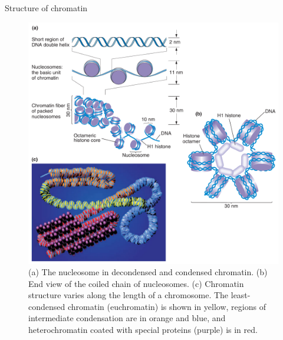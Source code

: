 \documentclass[11pt,ignorenonframetext,aspectratio=169]{beamer}
\begin{document}
\begin{frame}{Structure of chromatin}
\protect\hypertarget{structure-of-chromatin}{}
\begin{figure}

{\centering \includegraphics[width=0.45\linewidth]{../images/structure_of_chromatin} 

}

\caption{(a) The nucleosome in decondensed and condensed chromatin. (b) End view of the coiled chain of nucleosomes. (c) Chromatin structure varies along the length of a chromosome. The least-condensed chromatin (euchromatin) is shown in yellow, regions of intermediate condensation are in orange and blue, and heterochromatin coated with special proteins (purple) is in red.}\label{fig:structure-of-chromatin}
\end{figure}
\end{frame}
\end{document}
